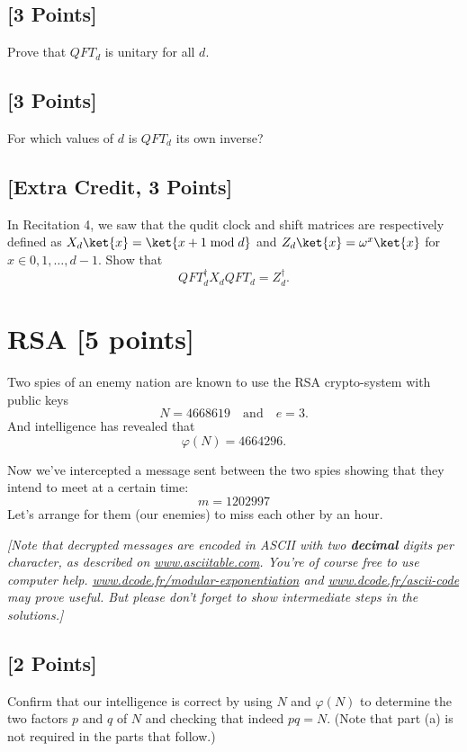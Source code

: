 \documentclass[11pt]{article}
\begin{document}
\subsection{[3 Points]}
Prove that $QFT_d$ is unitary for all $d$.




\subsection{[3 Points]}
For which values of $d$ is $QFT_d$ its own inverse?  




\subsection{[Extra Credit, 3 Points]}
In Recitation 4, we saw that the qudit clock and shift matrices are respectively defined as $X_d\ket{x} = \ket{x + 1 \bmod d}$ and $Z_d\ket{x} = \omega^x\ket{x}$ for $x \in 0,1,\ldots,d-1$. Show that $$QFT_d^\dagger X_d QFT_d = Z_d^\dagger.$$






\section{RSA [5 points]} Two spies of an enemy nation are known to use the RSA crypto-system with public keys
\[
N = 4668619 \quad\text{and}\quad e = 3.
\]
And intelligence has revealed that
\[
\varphi(N) = 4664296.
\]

Now we've intercepted a message sent between the two spies showing that they intend to meet at a certain time:
\[
m = 1202997
\]
Let's arrange for them (our enemies) to miss each other by an hour.

\textit{[Note that decrypted messages are encoded in ASCII with two \textbf{decimal} digits per character, as described on \url{www.asciitable.com}. You're of course free to use computer help. \url{www.dcode.fr/modular-exponentiation} and \url{www.dcode.fr/ascii-code} may prove useful. But please don't forget to show intermediate steps in the solutions.]}

\subsection{[2 Points]} Confirm that our intelligence is correct by using $N$ and $\varphi(N)$ to determine the two factors $p$ and $q$ of $N$ and checking that indeed $pq = N$. (Note that part (a) is not required in the parts that follow.)
\end{document}
